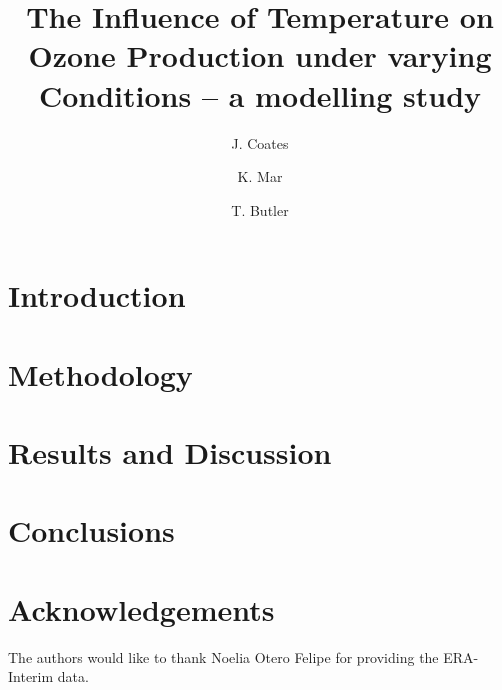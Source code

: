 \documentclass[11pt,a4paper]{article}
\title{The Influence of Temperature on Ozone Production under varying \ce{NO_x} Conditions -- a modelling study}
\author[1]{J. Coates}
\author[1]{K. Mar}
\author[1]{T. Butler}
\affil[1]{Institute for Advanced Sustainability Studies, Potsdam, Germany}
\begin{document}
\maketitle

\begin{abstract}
    
\end{abstract}

\section{Introduction} \label{s:introduction}


\section{Methodology} \label{s:methodology}


\section{Results and Discussion} \label{s:results}


\section{Conclusions} \label{s:conclusions}


\section*{Acknowledgements}
The authors would like to thank Noelia Otero Felipe for providing the ERA-Interim data.  


 
\end{document}
